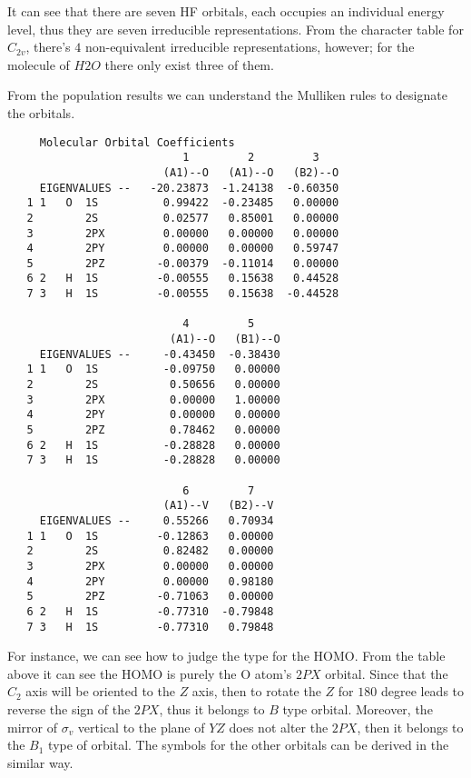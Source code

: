 It can see that there are seven HF orbitals, each occupies an
individual energy level, thus they are seven irreducible
representations. From the character table for $C_{2v}$, there's $4$
non-equivalent irreducible representations, however; for the molecule
of $H2O$ there only exist three of them.

From the population results we can understand the Mulliken rules to
designate the orbitals.

\begin{verbatim}
     Molecular Orbital Coefficients
                           1         2         3
                        (A1)--O   (A1)--O   (B2)--O
     EIGENVALUES --   -20.23873  -1.24138  -0.60350
   1 1   O  1S          0.99422  -0.23485   0.00000
   2        2S          0.02577   0.85001   0.00000
   3        2PX         0.00000   0.00000   0.00000
   4        2PY         0.00000   0.00000   0.59747
   5        2PZ        -0.00379  -0.11014   0.00000
   6 2   H  1S         -0.00555   0.15638   0.44528
   7 3   H  1S         -0.00555   0.15638  -0.44528

                           4         5
                         (A1)--O   (B1)--O
     EIGENVALUES --     -0.43450  -0.38430
   1 1   O  1S          -0.09750   0.00000
   2        2S           0.50656   0.00000
   3        2PX          0.00000   1.00000
   4        2PY          0.00000   0.00000
   5        2PZ          0.78462   0.00000
   6 2   H  1S          -0.28828   0.00000
   7 3   H  1S          -0.28828   0.00000

                           6         7
                        (A1)--V   (B2)--V
     EIGENVALUES --     0.55266   0.70934
   1 1   O  1S         -0.12863   0.00000
   2        2S          0.82482   0.00000
   3        2PX         0.00000   0.00000
   4        2PY         0.00000   0.98180
   5        2PZ        -0.71063   0.00000
   6 2   H  1S         -0.77310  -0.79848
   7 3   H  1S         -0.77310   0.79848
\end{verbatim}

For instance, we can see how to judge the type for the HOMO. From the
table above it can see the HOMO is purely the O atom's $2PX$
orbital. Since that the $C_{2}$ axis will be oriented to the $Z$ axis,
then to rotate the $Z$ for $180$ degree leads to reverse the sign of
the $2PX$, thus it belongs to $B$ type orbital. Moreover, the mirror
of $\sigma_{v}$ vertical to the plane of $YZ$ does not alter the
$2PX$, then it belongs to the $B_{1}$ type of orbital. The symbols for
the other orbitals can be derived in the similar way.

